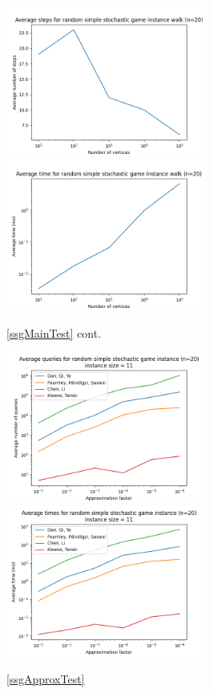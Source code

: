   \vspace{-20pt}
  \begin{figure}[H]
      \centering
      \includegraphics[width=2.6in]{plots/simple_steps.png}
      \centering
      \includegraphics[width=2.6in]{plots/simple_wtime.png}
      \caption{\cref{ssgMainTest} cont.} \label{simpleWalkPlot}
  \end{figure}
  \vspace{-20pt}
  \begin{figure}[H]
      \centering
      \includegraphics[width=2.6in]{plots/simple_eps_queries.png}
      \centering
      \includegraphics[width=2.6in]{plots/simple_eps_times.png}
      \caption{\cref{ssgApproxTest}} \label{simpleApproxPlot}
  \end{figure}
